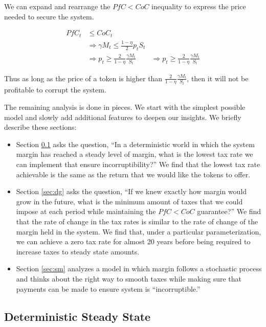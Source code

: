 \documentclass[12pt]{article}
\begin{document}
  We can expand and rearrange the $PfC < CoC$ inequality to express the price needed to secure the
  system.

  \begin{align*}
    PfC_t &\leq CoC_t \\
    &\Rightarrow \gamma M_t \leq \frac{1 - \eta}{2} p_t S_t \\
    &\Rightarrow p_t \geq \frac{2}{1 - \eta} \frac{\gamma M_t}{S_t}
    &\Rightarrow p_t \geq \frac{2}{1 - \eta} \frac{\gamma M_t}{S_t}
  \end{align*}

  Thus as long as the price of a token is higher than $\frac{2}{1 - \eta} \frac{\gamma M_t}{S_t}$,
  then it will not be profitable to corrupt the system.

  The remaining analysis is done in pieces. We start with the simplest possible model and slowly
  add additional features to deepen our insights. We briefly describe these sections:

  \begin{itemize}
    \item Section \ref{sec:dss} asks the question, ``In a deterministic world in which the system
          margin has reached a steady level of margin, what is the lowest tax rate we can implement
          that ensure incorruptibility?'' We find that the lowest tax rate achievable is the same
          as the return that we would like the tokens to offer.
    \item Section \ref{sec:dg} asks the question, ``If we knew exactly how margin would grow
          in the future, what is the minimum amount of taxes that we could impose at each
          period while maintaining the $PfC < CoC$ guarantee?'' We find that the rate of change in
          the tax rates is similar to the rate of change of the margin held in the system. We find
          that, under a particular parameterization, we can achieve a zero tax rate for almost 20
          years before being required to increase taxes to steady state amounts.
    \item Section \ref{sec:sm} analyzes a model in which margin follows a stochastic process and
          thinks about the right way to smooth taxes while making sure that payments can be made to
          ensure system is ``incorruptible.''
  \end{itemize}

  \subsection{Deterministic Steady State} \label{sec:dss}
    
\end{document}
